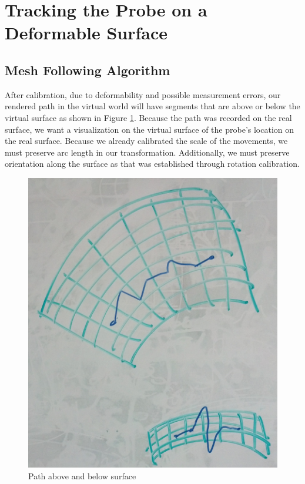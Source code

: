 \section{Tracking the Probe on a Deformable Surface}

\subsection{Mesh Following Algorithm}

After calibration, due to deformability and possible measurement errors, our rendered path in the virtual world will have segments that are above or below the virtual surface as shown in Figure \ref{pathsAboveAndBelow}. Because the path was recorded on the real surface, we want a visualization on the virtual surface of the probe's location on the real surface. Because we already calibrated the scale of the movements, we must preserve arc length in our transformation. Additionally, we must preserve orientation along the surface as that was established through rotation calibration.

\begin{figure}[ht]
\centering
\includegraphics[width=\columnwidth]{pathaboveandbelow.jpg}
\caption{Path above and below surface}
\label{pathsAboveAndBelow}
\end{figure}

